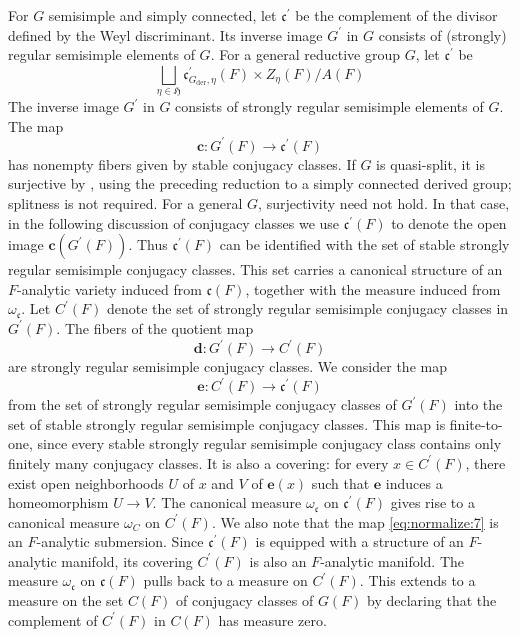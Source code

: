 \documentclass[iccmp]{ipbook}
\newcommand{\FH}{{\mathfrak {H}}}
\newcommand{\Fc}{{\mathfrak {c}}}
\def\ome{{\omega}}
\def\p{\prime}
\def\der{\mathrm{der}}
\def\bc{\mathbf{c}}
\begin{document}
For $G$ semisimple and simply connected, let $\Fc^\p$ be the complement of the divisor defined by the Weyl discriminant. Its inverse image $G^\p$ in $G$ consists of (strongly) regular semisimple elements of $G$. For a general reductive group $G$, let $\Fc^\p$ be 
$$
\bigsqcup_{\eta\in \FH}
\Fc^\p_{G_\der,\eta}(F)\times Z_\eta(F)/A(F)
$$
The inverse image $G^\p$ in $G$ consists of strongly regular semisimple elements of $G$. The map 
\begin{equation}\label{eq:normalize:6}
\bc:G^\p(F)\to \Fc^\p(F)
\end{equation}
has nonempty fibers given by stable conjugacy classes. If $G$ is quasi-split, it is surjective by \cite[Thm.~4.1]{kott2}, using the preceding reduction to a simply connected derived group; splitness is not required. For a general $G$, surjectivity need not hold. In that case, in the following discussion of conjugacy classes we use $\Fc^\p(F)$ to denote the open image $\bc(G^\p(F))$. Thus $\Fc^\p(F)$ can be identified with the set of stable strongly regular semisimple conjugacy classes. This set carries a canonical structure of an $F$-analytic variety induced from $\Fc(F)$, together with the measure induced from $\ome_\Fc$. Let $C^\p(F)$ denote the set of strongly regular semisimple conjugacy classes in $G^\p(F)$. The fibers of the quotient map
\begin{equation} \label{eq:normalize:7}
    \mathbf{d}:G^\p(F) \to C^\p(F)
\end{equation}
are strongly regular semisimple conjugacy classes. We consider the map 
$$
\mathbf{e}:C^\p(F)\to \Fc^\p(F)
$$
from the set of strongly regular semisimple conjugacy classes of $G^\p(F)$ into the set of stable strongly regular semisimple conjugacy classes. This map is finite-to-one, since every stable strongly regular semisimple conjugacy class contains only finitely many conjugacy classes. It is also a covering: for every $x\in C^\p(F)$, there exist open neighborhoods $U$ of $x$ and $V$ of $\mathbf{e}(x)$ such that $\mathbf{e}$ induces a homeomorphism $U\to V$. The canonical measure $\ome_{\Fc}$ on $\Fc^\p(F)$ gives rise to a canonical measure $\ome_C$ on $C^\p(F)$. We also note that the map \eqref{eq:normalize:7} is an $F$-analytic submersion. Since $\Fc^\p(F)$ is equipped with a structure of an $F$-analytic manifold, its covering $C^\p(F)$ is also an $F$-analytic manifold. The measure $\ome_\Fc$ on $\Fc(F)$ pulls back to a measure on $C^\p(F)$. This extends to a measure on the set $C(F)$ of conjugacy classes of $G(F)$ by declaring that the complement of $C^{\p}(F)$ in $C(F)$ has measure zero.
\end{document}
